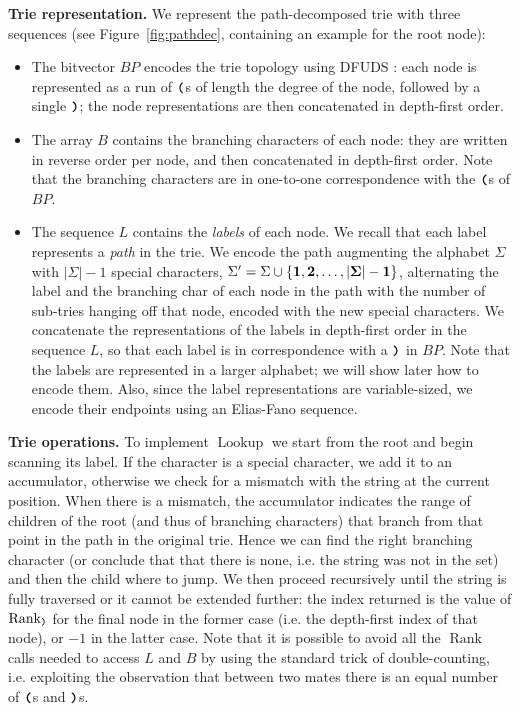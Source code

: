 \documentclass[a4paper,11pt]{article}
\newcommand{\shrinkitems}{\setlength{\itemsep}{0ex}} \newcommand{\sshrinkitems}{\setlength{\itemsep}{-1ex}} \newcommand{\shrinktable}{\setlength{\abovecaptionskip}{-1ex}\setlength{\belowcaptionskip}{-1ex}}
\newcommand{\ttlpar}[1]{\noindent\textbf{#1}}
\theoremstyle{nonumberplain}
\DeclareMathOperator{\Rank}{Rank}
\DeclareMathOperator{\Lookup}{Lookup}
\newcommand{\paropen}{\text{\bf\texttt{(}}}
\newcommand{\parclose}{\text{\bf\texttt{)}}}
\begin{document}
\ttlpar{Trie representation.} 
We represent the path-decomposed trie with three sequences (see
Figure~\ref{fig:pathdec}, containing an example for the root node):
\begin{itemize}\shrinkitems
\item The bitvector $BP$ encodes the trie topology using DFUDS
  \cite{dfuds}: each node is represented as a run of $\paropen$s of
  length the degree of the node, followed by a single $\parclose$; the
  node representations are then concatenated in depth-first order.
\item The array $B$ contains the branching characters of each node:
  they are written in reverse order per node, and then concatenated in
  depth-first order. Note that the branching characters are in
  one-to-one correspondence with the $\paropen$s of $BP$.
\item The sequence $L$ contains the \emph{labels} of each node. We
  recall that each label represents a \emph{path} in the trie. We
  encode the path augmenting the alphabet $\Sigma$ with $|\Sigma| - 1$
  special characters, $\Sigma' = \Sigma \cup \{{\bf 1}, {\bf 2},
  \dots, {\bf |\Sigma| - 1}\}$, alternating the label and the
  branching char of each node in the path with the number of sub-tries
  hanging off that node, encoded with the new special characters. We
  concatenate the representations of the labels in depth-first order
  in the sequence $L$, so that each label is in correspondence with a
  $\parclose$ in $BP$. Note that the labels are represented in a
  larger alphabet; we will show later how to encode them. Also, since the
  label representations are variable-sized, we encode their endpoints
  using an Elias-Fano sequence.
\end{itemize}

\ttlpar{Trie operations.} 
To implement $\Lookup$ we start from the root and begin scanning its
label. If the character is a special character, we add it to an
accumulator, otherwise we check for a mismatch with the string at the
current position. When there is a mismatch, the accumulator indicates
the range of children of the root (and thus of branching characters)
that branch from that point in the path in the original trie. Hence we
can find the right branching character (or conclude that that there is
none, i.e. the string was not in the set) and then the child where to
jump. We then proceed recursively until the string is fully traversed
or it cannot be extended further: the index returned is the value of
$\Rank_{\parclose}$ for the final node in the former case (i.e.\mbox{}
the depth-first index of that node), or $-1$ in the latter
case. Note that it is possible to avoid all the $\Rank$ calls needed
to access $L$ and $B$ by using the standard trick of double-counting,
i.e. exploiting the observation that between two mates there is an equal
number of $\paropen$s and $\parclose$s.
\end{document}
